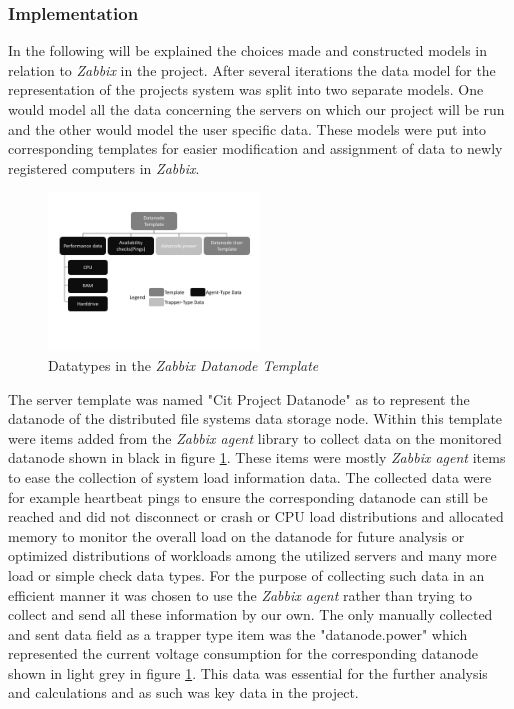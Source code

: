 \subsubsection{Implementation}
	In the following will be explained the choices made and constructed models in relation to \textit{Zabbix} in the project.
	After several iterations the data model for the representation of the projects system was split into two separate models. One would model all the data concerning the servers on which our project will be run and the other would model the user specific data. These models were put into corresponding templates for easier modification and assignment of data to newly registered computers in \textit{Zabbix}.
\begin{figure}[ht]
\centering
\includegraphics[width=0.5\textwidth]{img/ZabbixDatanodeTemp} 

\caption{Datatypes in the \textit{Zabbix Datanode Template}}
\label{zabbix_datanode_template}
\end{figure}
	The server template was named "Cit Project Datanode" as to represent the datanode of the  distributed file systems data storage node. Within this template were items added from the \textit{Zabbix agent} library to collect data on the monitored datanode shown in black in  figure \ref{zabbix_datanode_template}. These items were mostly \textit{Zabbix agent} items to ease the collection of system load information data. The collected data were for example heartbeat pings to ensure the corresponding datanode can still be reached and did not disconnect or crash or CPU load distributions and allocated memory to monitor the overall load on the datanode for future analysis or optimized distributions of workloads among the utilized servers and many more load or simple check data types. For the purpose of collecting such data in an efficient manner it was chosen to use the \textit{Zabbix agent} rather than trying to collect and send all these information by our own. The only manually collected and sent data field as a trapper type item was the "datanode.power" which represented the current voltage consumption for the corresponding datanode shown in light grey in figure \ref{zabbix_datanode_template}. This data was essential for the further analysis and calculations and as such was key data in the project.
